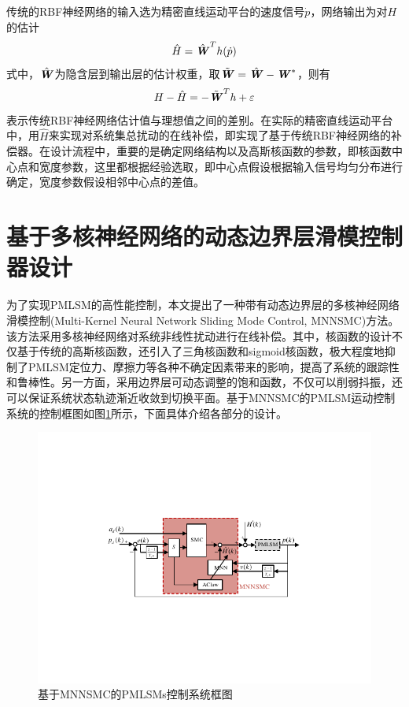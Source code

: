 传统的RBF神经网络的输入选为精密直线运动平台的速度信号$\dot{p}$，网络输出为对$H$的估计
\begin{equation}
\hat{H}={\hat{\textbf{\textit{W}}}}^{T}h(\dot{p})
\end{equation}
式中，$\hat{\textbf{\textit{W}}}$为隐含层到输出层的估计权重，取$\tilde{\textbf{\textit{W}}}=\hat{\textbf{\textit{W}}}-\textbf{\textit{W}}^*$，则有
\begin{equation}
H-\hat{H}=-{{\tilde{\textbf{\textit{W}}}}^{T}}h+\varepsilon
\end{equation}
表示传统RBF神经网络估计值与理想值之间的差别。在实际的精密直线运动平台中，用$\hat{H}$来实现对系统集总扰动的在线补偿，即实现了基于传统RBF神经网络的补偿器。在设计流程中，重要的是确定网络结构以及高斯核函数的参数，即核函数中心点和宽度参数，这里都根据经验选取，即中心点假设根据输入信号均匀分布进行确定，宽度参数假设相邻中心点的差值。

\section{基于多核神经网络的动态边界层滑模控制器设计}
为了实现PMLSM的高性能控制，本文提出了一种带有动态边界层的多核神经网络滑模控制(Multi-Kernel Neural Network Sliding Mode Control, MNNSMC)方法。该方法采用多核神经网络对系统非线性扰动进行在线补偿。其中，核函数的设计不仅基于传统的高斯核函数，还引入了三角核函数和sigmoid核函数，极大程度地抑制了PMLSM定位力、摩擦力等各种不确定因素带来的影响，提高了系统的跟踪性和鲁棒性。另一方面，采用边界层可动态调整的饱和函数，不仅可以削弱抖振，还可以保证系统状态轨迹渐近收敛到切换平面。基于MNNSMC的PMLSM运动控制系统的控制框图如图\ref{MNNSMC控制架构}所示，下面具体介绍各部分的设计。
\begin{figure}[H]
	\centering
	\includegraphics[width=12cm]{figures/MNNSMC控制架构1.pdf}
	\caption{基于MNNSMC的PMLSMs控制系统框图}
	\label{MNNSMC控制架构}
\end{figure}

